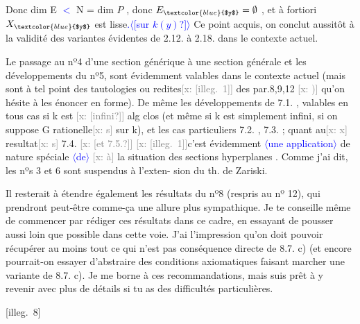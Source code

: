 \documentclass[11pt]{article}
\newcommand{\scanpage}[1]{\par\bigskip\noindent{\small\sffamily[scan #1]}\par}
\newcommand{\mspage}[1]{{\small\sffamily[p.\,#1]}}
\newcommand{\hand}[1]{\textcolor{blue}{#1}}
\newcommand{\inserted}[2][]{\textcolor{blue}{$\langle$#2$\rangle$}}
\newcommand{\xout}[1]{\textcolor{gray}{[\textsf{x:} #1]}}
\newcommand{\unsure}[1]{[#1?]}
\newcommand{\illegible}[1]{[\textsf{illeg.\ #1}]}
\begin{document}
Donc dim E \hand{$<$} N = dim $P$ , donc $E_{\hand{$y$}} = \emptyset$ , et à fortiori $X_{\hand{$y$}}$ est lisse\hand{.}\inserted{\unsure{sur $k(y)$}}
Ce point acquis, on conclut aussitôt à la validité des variantes
évidentes de 2.12. à 2.18. dans le contexte actuel.

Le passage au nº4 d'une section générique à une section générale
et les développements du nº5, sont évidemment valables dans le contexte
actuel (mais sont à tel point des tautologies ou redites\xout{\illegible{1}} des
par.8,9,12 \xout{)} qu'on hésite à les énoncer en forme). De même les
développements de 7.1. , valables en tous cas si k est \xout{\unsure{infini}} alg clos
(et même si k est simplement infini, si on suppose G rationelle\xout{s} sur k),
et les cas particuliers 7.2. , 7.3. ; quant au\xout{x} resultat\xout{s} 7.4. \xout{\unsure{et 7.5.}}
\xout{\illegible{1}}c'est évidemment \inserted[typed]{une application} de nature spéciale \inserted[typed]{de} \xout{à} la situation des sections
hyperplanes . Comme j'ai dit, les nºs 3 et 6 sont suspendus à l'exten-%
sion du th. de Zariski.

Il resterait à étendre également les résultats du nº8 (respris au
nº 12), qui prendront peut-être comme-ça une allure plus sympathique.
Je te conseille même de commencer par rédiger ces résultats dans ce cadre,
en essayant de pousser aussi loin que possible dans cette voie. J'ai
l'impression qu'on doit pouvoir récupérer au moins tout ce qui n'est pas
conséquence directe de 8.7. c) (et encore pourrait-on essayer
d'abstraire des conditions axiomatiques faisant marcher une variante de
8.7. c). Je me borne à ces recommandations, mais suis prêt à y revenir
avec plus de détails si tu as des difficultés particulières.

\mspage{95}

\clearpage
\scanpage{25/96}
\mspage{96}

\clearpage
\scanpage{25/97}
\illegible{8}
\end{document}
